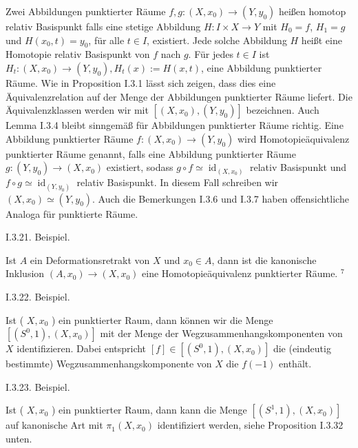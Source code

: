 \documentclass[10pt, letterpaper]{article}
\begin{document}
Zwei Abbildungen punktierter Räume $f, g:\left(X, x_{0}\right) \rightarrow\left(Y, y_{0}\right)$ heißen homotop relativ Basispunkt falls eine stetige Abbildung $H: I \times X \rightarrow Y$ mit $H_{0}=f$, $H_{1}=g$ und $H\left(x_{0}, t\right)=y_{0}$, für alle $t \in I$, existiert. Jede solche Abbildung $H$ heißt eine Homotopie relativ Basispunkt von $f$ nach $g$. Für jedes $t \in I$ ist $H_{t}:\left(X, x_{0}\right) \rightarrow\left(Y, y_{0}\right), H_{t}(x):=H(x, t)$, eine Abbildung punktierter Räume. Wie in Proposition I.3.1 lässt sich zeigen, dass dies eine Äquivalenzrelation auf der Menge der Abbildungen punktierter Räume liefert. Die Äquivalenzklassen werden wir mit $\left[\left(X, x_{0}\right),\left(Y, y_{0}\right)\right]$ bezeichnen. Auch Lemma I.3.4 bleibt sinngemäß für Abbildungen punktierter Räume richtig. Eine Abbildung punktierter Räume $f:\left(X, x_{0}\right) \rightarrow\left(Y, y_{0}\right)$ wird Homotopieäquivalenz punktierter Räume genannt, falls eine Abbildung punktierter Räume $g:\left(Y, y_{0}\right) \rightarrow\left(X, x_{0}\right)$ existiert, sodass $g \circ f \simeq \operatorname{id}_{\left(X, x_{0}\right)}$ relativ Basispunkt und $f \circ g \simeq \operatorname{id}_{\left(Y, y_{0}\right)}$ relativ Basispunkt. In diesem Fall schreiben wir $\left(X, x_{0}\right) \simeq\left(Y, y_{0}\right)$. Auch die Bemerkungen I.3.6 und I.3.7 haben offensichtliche Analoga für punktierte Räume.



I.3.21. Beispiel. 

Ist $A$ ein Deformationsretrakt von $X$ und $x_{0} \in A$, dann ist die kanonische Inklusion $\left(A, x_{0}\right) \rightarrow\left(X, x_{0}\right)$ eine Homotopieäquivalenz punktierter Räume. ${ }^{7}$


I.3.22. Beispiel. 

Ist ( $X, x_{0}$ ) ein punktierter Raum, dann können wir die Menge $\left[\left(S^{0}, 1\right),\left(X, x_{0}\right)\right]$ mit der Menge der Wegzusammenhangskomponenten von $X$ identifizieren. Dabei entspricht $[f] \in\left[\left(S^{0}, 1\right),\left(X, x_{0}\right)\right]$ die (eindeutig bestimmte) Wegzusammenhangskomponente von $X$ die $f(-1)$ enthält.



I.3.23. Beispiel. 

Ist ( $X, x_{0}$ ) ein punktierter Raum, dann kann die Menge $\left[\left(S^{1}, 1\right),\left(X, x_{0}\right)\right]$ auf kanonische Art mit $\pi_{1}\left(X, x_{0}\right)$ identifiziert werden, siehe Proposition I.3.32 unten.\\
\end{document}
